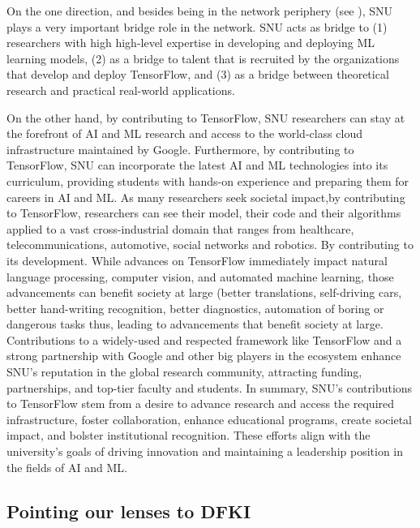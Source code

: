 \documentclass[CHICAGO,Times1COL]{WileyNJDv5} %
\begin{document}
On the one direction, and besides being in the network periphery (see  ), SNU plays a very important bridge role in the network. SNU acts as bridge to (1) researchers with high high-level expertise in developing and deploying \ac{ML} learning models,  (2) as a bridge to talent that is recruited by the organizations that develop and deploy TensorFlow, and (3)
as a bridge between theoretical research and practical real-world applications.



On the other hand, by  contributing to TensorFlow, SNU researchers can stay at the forefront of AI and \ac{ML} research and  access to the world-class cloud infrastructure maintained by Google. Furthermore, by contributing to TensorFlow, SNU can incorporate the latest \ac{AI} and \ac{ML} technologies into its curriculum, providing students with hands-on experience and preparing them for careers in \ac{AI} and \ac{ML}. As many researchers seek societal impact,by contributing to TensorFlow, researchers can see their model, their code and their algorithms applied to a vast cross-industrial domain that ranges from healthcare, telecommunications, automotive, social networks and robotics. By contributing to its development.  While advances on TensorFlow  immediately impact  natural language processing, computer vision, and automated machine learning, those advancements can benefit society at large (better translations, self-driving cars, better hand-writing recognition, better diagnostics, automation of boring or dangerous tasks thus, leading to advancements that benefit society at large. Contributions to a widely-used and respected framework like TensorFlow and a strong partnership with Google and other big players in the ecosystem enhance SNU's reputation in the global research community, attracting funding, partnerships, and top-tier faculty and students. In summary, SNU's contributions to TensorFlow stem from a desire to advance research and access the required infrastructure, foster collaboration, enhance educational programs, create societal impact, and bolster institutional recognition. These efforts align with the university's goals of driving innovation and maintaining a leadership position in the fields of \ac{AI} and \ac{ML}.

\subsection{Pointing our lenses to DFKI}
\end{document}

